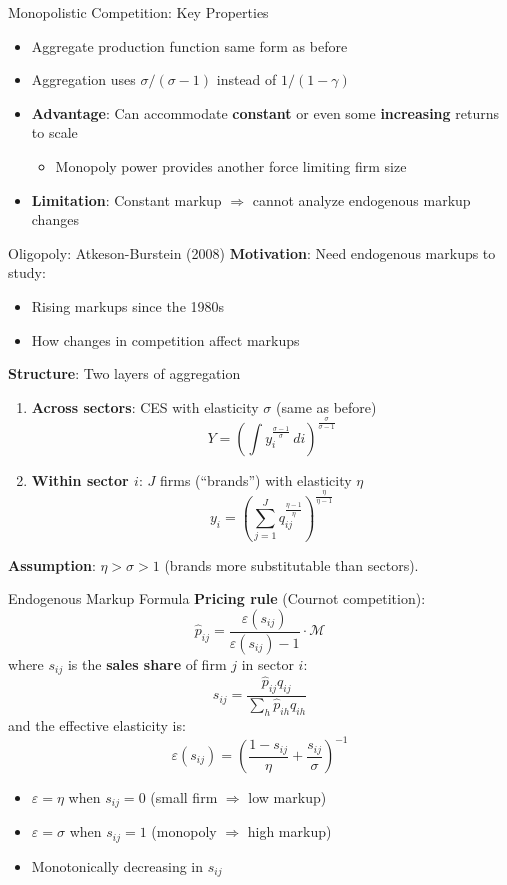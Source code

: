 \documentclass[blue]{beamer}
\begin{document}
\begin{frame}{Monopolistic Competition: Key Properties}
	\begin{itemize}
		\item Aggregate production function same form as before
		\item Aggregation uses $\sigma/(\sigma-1)$ instead of $1/(1-\gamma)$
		\item \textbf{Advantage}: Can accommodate \textbf{constant} or even some \textbf{increasing} returns to scale
		\begin{itemize}
			\item Monopoly power provides another force limiting firm size
		\end{itemize}
		\item \textbf{Limitation}: Constant markup $\Rightarrow$ cannot analyze endogenous markup changes
	\end{itemize}
\end{frame}

\begin{frame}{Oligopoly: Atkeson-Burstein (2008)}
	\textbf{Motivation}: Need endogenous markups to study:
	\begin{itemize}
		\item Rising markups since the 1980s
		\item How changes in competition affect markups
	\end{itemize}
	
	\bigskip
	\textbf{Structure}: Two layers of aggregation
	\begin{enumerate}
		\item \textbf{Across sectors}: CES with elasticity $\sigma$ (same as before)
		\[
		Y = \left( \int y_i^{\frac{\sigma-1}{\sigma}} \, di \right)^{\frac{\sigma}{\sigma-1}}
		\]
		\item \textbf{Within sector $i$}: $J$ firms (``brands'') with elasticity $\eta$
		\[
		y_i = \left( \sum_{j=1}^J q_{ij}^{\frac{\eta-1}{\eta}} \right)^{\frac{\eta}{\eta-1}}
		\]
	\end{enumerate}
	
	\textbf{Assumption}: $\eta > \sigma > 1$ (brands more substitutable than sectors).
\end{frame}

\begin{frame}{Endogenous Markup Formula}
	\textbf{Pricing rule} (Cournot competition):
	\[
	\hat{p}_{ij} = \frac{\varepsilon(s_{ij})}{\varepsilon(s_{ij}) - 1} \cdot \mathcal{M}
	\]
	where $s_{ij}$ is the \textbf{sales share} of firm $j$ in sector $i$:
	\[
	s_{ij} = \frac{\hat{p}_{ij} q_{ij}}{\sum_h \hat{p}_{ih} q_{ih}}
	\]
	and the effective elasticity is:
	\[
	\varepsilon(s_{ij}) = \left( \frac{1-s_{ij}}{\eta} + \frac{s_{ij}}{\sigma} \right)^{-1}
	\]
	
	\begin{itemize}
		\item $\varepsilon = \eta$ when $s_{ij} = 0$ (small firm $\Rightarrow$ low markup)
		\item $\varepsilon = \sigma$ when $s_{ij} = 1$ (monopoly $\Rightarrow$ high markup)
		\item Monotonically decreasing in $s_{ij}$
	\end{itemize}
\end{frame}
\end{document}
